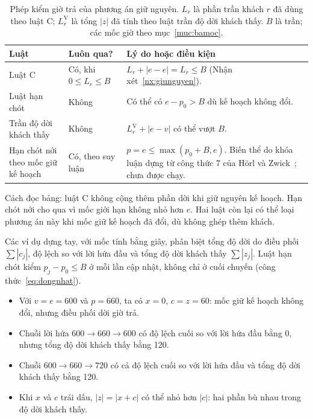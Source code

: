 \begin{table}[htbp]
\centering
\caption{Phép kiểm giờ trả của phương án giữ nguyên. $L_r$ là phần trần khách $r$ đã dùng theo luật C; $L_r^{\mathrm V}$ là tổng $|z|$ đã tính theo luật trần độ dời khách thấy. $B$ là trần; các mốc giờ theo mục~\ref{muc:bamoc}.}
\label{bang:pl-giunguyen}
\begin{tabular}{@{}p{3.4cm}p{2.7cm}p{8.7cm}@{}}
\toprule
\textbf{Luật} & \textbf{Luôn qua?} & \textbf{Lý do hoặc điều kiện} \\
\midrule
Luật C & Có, khi $0\le L_r\le B$ & $L_r+|e-e|=L_r\le B$ (Nhận xét~\ref{nx:giunguyen}). \\
Luật hạn chót & Không & Có thể có $e-p_0>B$ dù kế hoạch không đổi. \\
Trần độ dời khách thấy & Không & $L_r^{\mathrm V}+|e-v|$ có thể vượt $B$. \\
Hạn chót nới theo mốc giữ kế hoạch & Có, theo suy luận & $p=e\le\max(p_0+B,e)$. Biến thể do khóa luận dựng từ công thức 7 của Hörl và Zwick~\cite{horl2022}; chưa được chạy. \\
\bottomrule
\end{tabular}
\end{table}

Cách đọc bảng: luật C không cộng thêm phần dời khi giữ nguyên kế hoạch. Hạn chót nới cho qua vì mốc giới hạn không nhỏ hơn $e$. Hai luật còn lại có thể loại phương án này khi mốc giữ kế hoạch đã đổi, dù không ghép thêm khách.

Các ví dụ dựng tay, với mốc tính bằng giây, phân biệt tổng độ dời do điều phối $\sum|c_j|$, độ lệch so với lời hứa đầu và tổng độ dời khách thấy $\sum|z_j|$. Luật hạn chót kiểm $p_j-p_0\le B$ ở mỗi lần cập nhật, không chỉ ở cuối chuyến (công thức~\eqref{eq:dongnhat}).
\begin{itemize}[leftmargin=1.2cm,itemsep=0pt,topsep=2pt]
\item Với $v=e=600$ và $p=660$, ta có $x=0$, $c=z=60$: mốc giữ kế hoạch không đổi, nhưng điều phối dời giờ trả.
\item Chuỗi lời hứa $600\to660\to600$ có độ lệch cuối so với lời hứa đầu bằng 0, nhưng tổng độ dời khách thấy bằng 120.
\item Chuỗi $600\to660\to720$ có cả độ lệch cuối so với lời hứa đầu và tổng độ dời khách thấy bằng 120.
\item Khi $x$ và $c$ trái dấu, $|z|=|x+c|$ có thể nhỏ hơn $|c|$: hai phần bù nhau trong độ dời khách thấy.
\end{itemize}

